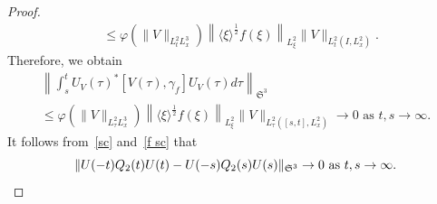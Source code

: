 \documentclass[10pt,a4paper]{amsart}
\providecommand{\No}[1]{\left\| #1 \right\|}
\newcommand{\FS}{\mathfrak{S}}
\newcommand{\ga}{\gamma}
\newcommand{\ph}{\varphi}
\newcommand{\ta}{\tau}
\renewcommand{\No}[1]{\left\| #1 \right\|}
\newcommand{\I}{\infty}
\newcommand{\lxr}{\langle \xi \rangle}
\newcommand{\tw}{\frac{1}{2}}
\begin{document}
\begin{proof}
\begin{equation}
\begin{split}
&\le \ph\left(\|V\|_{L^2_t L^3_x}\right) \left\|\lxr^\tw f(\xi)\right\|_{L^2_\xi} \|V\|_{L^2_t(I,L^2_x)}.
\end{split}
\end{equation}
Therefore, we obtain
\begin{multline}\label{f sc}
\No{ \int_s^t U_V(\ta)^*[V(\ta),\ga_f] U_V(\ta) d\ta }_{\FS^3} \\
\le \ph\left(\|V\|_{L^2_\ta L^3_x}\right) \left\|\lxr^\tw f(\xi)\right\|_{L^2_\xi} \|V\|_{L^2_\ta\left([s,t],L^2_x\right)} 
\to 0 \text{ as } t,s \to \I. 
\end{multline}
It follows from~\eqref{sc} and~\eqref{f sc} that
\begin{equation}
\|U(-t)Q_2(t)U(t)-U(-s)Q_2(s)U(s)\|_{\FS^3} \to 0 \text{ as } t,s \to \I. \qedhere
\end{equation}
\end{proof}
\end{document}

